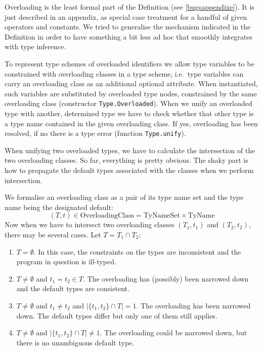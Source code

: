 \documentclass[twoside,titlepage]{article}
\begin{document}
Overloading is the least formal part of the Definition (see \ref{bugsappendixe}). It is just described in an appendix, as special case treatment for a handful of given operators and constants. We tried to generalise the mechanism indicated in the Definition in order to have something a bit less ad hoc that smoothly integrates with type inference.

To represent type schemes of overloaded identifiers we allow type variables to be constrained with overloading classes in a type scheme, i.e.\ type variables can carry an overloading class as an additional optional attribute. When instantiated, such variables are substituted by overloaded type nodes, constrained by the same overloading class (constructor {\tt Type.Overloaded}). When we unify an overloaded type with another, determined type we have to check whether that other type is a type name contained in the given overloading class. If yes, overloading has been resolved, if no there is a type error (function {\tt Type.unify}).

When unifying two overloaded types, we have to calculate the intersection of the two overloading classes. So far, everything is pretty obvious. The shaky part is how to propagate the default types associated with the classes when we perform intersection.

We formalise an overloading class as a pair of its type name set and the type name being the designated default:
%
\begin{displaymath}
(T,t) \in \mbox{OverloadingClass} = \mbox{TyNameSet} \times \mbox{TyName}
\end{displaymath}
%
Now when we have to intersect two overloading classes $(T_1,t_1)$ and $(T_2,t_2)$, there may be several cases. Let $T = T_1 \cap T_2$:

\begin{enumerate}
\item\label{intersectempty} $T = \emptyset$. In this case, the constraints on the types are inconsistent and the program in question is ill-typed.

\item\label{defaultequal} $T \neq \emptyset$ and $t_1 = t_2 \in T$. The overloading has (possibly) been narrowed down and the default types are consistent.

\item\label{uniquedefault} $T \neq \emptyset$ and $t_1 \neq t_2$ and $|\{t_1,t_2\} \cap T| = 1$. The overloading has been narrowed down. The default types differ but only one of them still applies.

\item\label{ambiguousdefault} $T \neq \emptyset$ and $|\{t_1,t_2\} \cap T| \neq 1$. The overloading could be narrowed down, but there is no unambiguous default type.
\end{enumerate}
\end{document}
